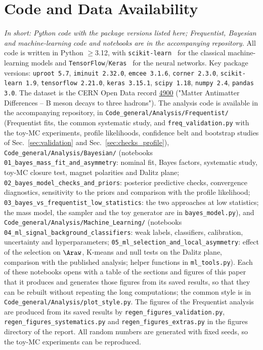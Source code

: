 \section{Code and Data Availability}
\label{sec:code}
\emph{In short: Python code with the package versions listed here; Frequentist, Bayesian and machine-learning code and notebooks are in the accompanying repository.}
All code is written in Python $\geq$3.12, with \texttt{scikit-learn}~\cite{sklearn} for the classical machine-learning models and \texttt{TensorFlow}/\texttt{Keras}~\cite{tensorflow} for the neural networks. Key package versions: \texttt{uproot 5.7}, \texttt{iminuit 2.32.0}, \texttt{emcee 3.1.6}, \texttt{corner 2.3.0}, \texttt{scikit-learn 1.9}, \texttt{tensorflow 2.21.0}, \texttt{keras 3.15.1}, \texttt{scipy 1.18}, \texttt{numpy 2.4}, \texttt{pandas 3.0}.
The dataset is the CERN Open Data record \href{https://opendata.cern.ch/record/4900}{4900} ("Matter Antimatter Differences -- B meson decays to three hadrons"). The analysis code is available in the accompanying repository, in \texttt{Code\_general/Analysis/Frequentist/} (Frequentist fits, the common systematic study, and \texttt{freq\_validation.py} with the toy-MC experiments, profile likelihoods, confidence belt and bootstrap studies of Sec.~\ref{sec:validation} and Sec.~\ref{sec:checks_profile}), \texttt{Code\_general/Analysis/Bayesian/} (notebooks \texttt{01\_bayes\_mass\_fit\_and\_asymmetry}: nominal fit, Bayes factors, systematic study, toy-MC closure test, magnet polarities and Dalitz plane; \texttt{02\_bayes\_model\_checks\_and\_priors}: posterior predictive checks, convergence diagnostics, sensitivity to the priors and comparison with the profile likelihood; \texttt{03\_bayes\_vs\_frequentist\_low\_statistics}: the two approaches at low statistics; the mass model, the sampler and the toy generator are in \texttt{bayes\_model.py}), and \texttt{Code\_general/Analysis/Machine\_Learning/} (notebooks \texttt{04\_ml\_signal\_background\_classifiers}: weak labels, classifiers, calibration, uncertainty and hyperparameters; \texttt{05\_ml\_selection\_and\_local\_asymmetry}: effect of the selection on $\Araw$, K-means and null tests on the Dalitz plane, comparison with the published analysis; helper functions in \texttt{ml\_tools.py}). Each of these notebooks opens with a table of the sections and figures of this paper that it produces and generates those figures from its saved results, so that they can be rebuilt without repeating the long computations; the common style is in \texttt{Code\_general/Analysis/plot\_style.py}. The figures of the Frequentist analysis are produced from its saved results by \texttt{regen\_figures\_validation.py}, \texttt{regen\_figures\_systematics.py} and \texttt{regen\_figures\_extras.py} in the figures directory of the report. All random numbers are generated with fixed seeds, so the toy-MC experiments can be reproduced.
